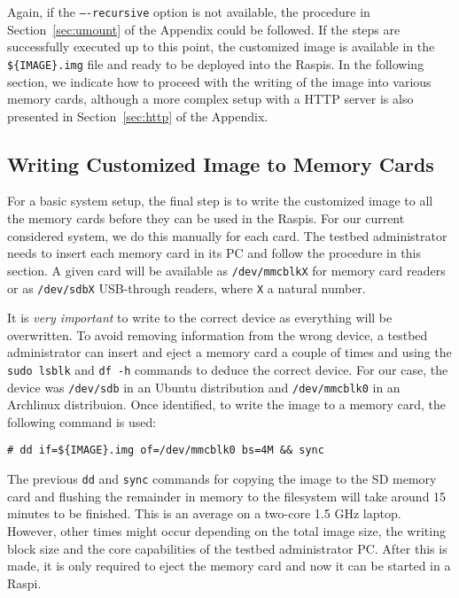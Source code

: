 Again, if the \texttt{----recursive} option is not available, the
procedure in Section~\ref{sec:umount} of the Appendix could be followed.
If the steps are successfully executed up to this point, the customized image
is available in the \texttt{\$\{IMAGE\}.img} file and ready to be deployed
into the \ac{Raspi}s. In the following section, we indicate how to proceed
with the writing of the image into various memory cards, although a more
complex setup with a \ac{HTTP} server is also presented in
Section~\ref{sec:http} of the Appendix.

\subsection{Writing Customized Image to Memory Cards}
For a basic system setup, the final step is to write the customized image
to all the memory cards before they can be used in the \ac{Raspi}s. For
our current considered system, we do this manually for each card.
The testbed administrator needs to insert each memory card in its \ac{PC}
and follow the procedure in this section. A given card will be available as
\texttt{/dev/mmcblkX} for memory card readers or as \texttt{/dev/sdbX}
USB-through readers, where \texttt{X} a natural number.

It is \textit{very important} to write to the correct device as
everything will be overwritten. To avoid removing information from the
wrong device, a testbed administrator can insert and eject a memory
card a couple of times and using the \texttt{sudo lsblk} and \texttt{df -h}
commands to deduce the correct device. For our case, the device was
\texttt{/dev/sdb} in an Ubuntu distribution and
\texttt{/dev/mmcblk0} in an Archlinux distribuion. Once identified, to write
the image to a memory card, the following command is used:

\begin{lstlisting}[]
# dd if=${IMAGE}.img of=/dev/mmcblk0 bs=4M && sync
\end{lstlisting}
\FloatBarrier
\vspace{-5mm}

The previous \texttt{dd} and \texttt{sync} commands for copying the image to
the SD memory card and flushing the remainder in memory to the filesystem
will take around 15 minutes to be finished. This is an average on a two-core
1.5 GHz laptop. However, other times might occur depending on the total image
size, the writing block size and the core capabilities of the testbed
administrator \ac{PC}. After this is made, it is only required
to eject the memory card and now it can be started in a \ac{Raspi}.